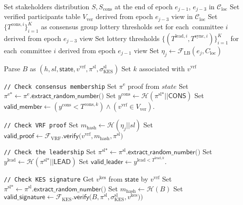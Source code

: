 \begin{algorithm}[ht]
    \begin{algorithmic}[1]
        \caption{$\textsf{IsValidBlock}(B)$}

        \State Set stakeholders distribution $S, S_{\text{cons}}$ at the end of epoch $e_{j - 1}$, $e_{j - 3}$ in $\mathcal{C}_{\text{loc}}$
        \State Set verified participants table $V_{\text{ver}}$ derived from epoch $e_{j - 3}$ view in $\mathcal{C}_{\text{loc}}$
        \State Set $\{T^{\text{cons}, i}\}_{i=1}^K$ as consensus group lottery thresholds set for each\
        committee $i$ derived from epoch $e_{j - 3}$ view
        \State Set lottery thresholds $\{(T^{\text{lead}, i}, T^{\text{sync}, i})\}_{i=1}^K$ for each\
        committee $i$ derived from epoch $e_{j - 1}$ view
        \State Set ${\eta_j \leftarrow \mathcal{F}_{\text{LB}}(e_j, C_{\text{loc}})}$

        \State Parse $B$ as ${(h, sl, \textsf{state}, v^{\text{vrf}}, \pi^{\text{sl}}, \sigma_{\text{KES}}^{\text{sl}})}$
        \State Set $k$ associated with $v^{\text{vrf}}$

        \State \lstinline|// Check consensus membership|
        \State Set ${\pi^{\text{e}}}$ proof from $state$
        \State Set ${\pi^{\text{e}*} \leftarrow \pi^{\text{e}}\textsf{.extract\_random\_number()}}$
        \State Set ${y^{\text{cons}} \leftarrow {\mathcal{H}(\pi^{\text{sl}*} || \textsf{CONS})}}$
        \State Set ${\textsf{valid\_member} \leftarrow (y^{\text{cons}} < T^{\text{cons}, k})
        \wedge (v^{\text{vrf}} \in V_{\text{ver}})}$.

        \State \lstinline|// Check VRF proof|
        \State Set $m_{\text{hash}} \leftarrow \mathcal{H}(\eta_j || sl)$
        \State Set $\textsf{valid\_proof} \leftarrow \mathcal{F}_{\text{VRF}}\textsf{.verify(}
        v^{\text{vrf}}, m_{\text{hash}},\pi^{\text{sl}} \textsf{)}$

        \State \lstinline|// Check the leadership|
        \State Set ${\pi^{\text{sl}*} \leftarrow \pi^{\text{sl}}\textsf{.extract\_random\_number()}}$
        \State Set ${y^{\text{lead}} \leftarrow {\mathcal{H}(\pi^{\text{sl}*} || \textsf{LEAD})}}$
        \State Set ${\textsf{valid\_leader} \leftarrow y^{\text{lead} < T^{\text{lead}, k}}}$.

        \State \lstinline|// Check KES signature|
        \State Get $v^{\text{kes}}$ from $\textsf{state}$ by $v^{\text{vrf}}$
        \State Set ${\pi^{\text{sl}*} \leftarrow \pi^{\text{sl}}\textsf{.extract\_random\_number()}}$
        \State Set $m_{\text{hash}} \leftarrow \mathcal{H}(B)$
        \State Set $\textsf{valid\_signature} \leftarrow \mathcal{F}_{\text{KES}}\textsf{.verify(}
        B,\pi^{\text{sl}}, \sigma_{\text{KES}}^{\text{sl}}, v^{\text{kes}}) \textsf{)}$


\end{algorithmic}
\end{algorithm}
